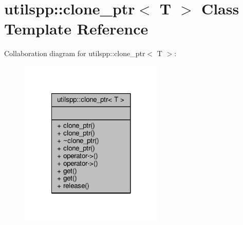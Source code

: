 \hypertarget{classutilspp_1_1clone__ptr}{\section{utilspp\-:\-:clone\-\_\-ptr$<$ T $>$ Class Template Reference}
\label{classutilspp_1_1clone__ptr}
}


Collaboration diagram for utilspp\-:\-:clone\-\_\-ptr$<$ T $>$\-:
\nopagebreak
\begin{figure}[H]
\begin{center}
\leavevmode
\includegraphics[width=194pt]{classutilspp_1_1clone__ptr__coll__graph}
\end{center}
\end{figure}
